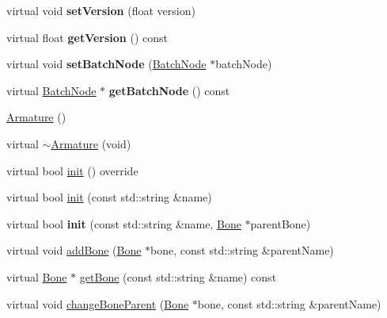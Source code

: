\begin{DoxyCompactItemize}
\item 
\mbox{\label{classcocostudio_1_1Armature_aa7a51245d492cd407f53d6118b4db04f}} 
virtual void {\bfseries set\+Version} (float version)
\item 
\mbox{\label{classcocostudio_1_1Armature_ab58b26fd8e6defdaf6027297337bb5b6}} 
virtual float {\bfseries get\+Version} () const
\item 
\mbox{\label{classcocostudio_1_1Armature_a955eae625c52b5c559f0265ef0ac8ae8}} 
virtual void {\bfseries set\+Batch\+Node} (\hyperlink{classcocostudio_1_1BatchNode}{Batch\+Node} $\ast$batch\+Node)
\item 
\mbox{\label{classcocostudio_1_1Armature_a91867c634809bb6c93bc29b406ac3927}} 
virtual \hyperlink{classcocostudio_1_1BatchNode}{Batch\+Node} $\ast$ {\bfseries get\+Batch\+Node} () const
\item 
\hyperlink{classcocostudio_1_1Armature_a718f247b339d19f4159b9abf847826aa}{Armature} ()
\item 
virtual \hyperlink{classcocostudio_1_1Armature_a7823517771d2cbb4847197d987e89d12}{$\sim$\+Armature} (void)
\item 
virtual bool \hyperlink{classcocostudio_1_1Armature_a0040255ac5cd22f79d0756ed6ecf2e98}{init} () override
\item 
virtual bool \hyperlink{classcocostudio_1_1Armature_a22bc686ea92c2dad9559d848fb3554f1}{init} (const std\+::string \&name)
\item 
\mbox{\label{classcocostudio_1_1Armature_ab87c0172fffa77e39fe06a85c7c76c9d}} 
virtual bool {\bfseries init} (const std\+::string \&name, \hyperlink{classcocostudio_1_1Bone}{Bone} $\ast$parent\+Bone)
\item 
virtual void \hyperlink{classcocostudio_1_1Armature_a59f16d46413e78cf4b8cdcf17daa0971}{add\+Bone} (\hyperlink{classcocostudio_1_1Bone}{Bone} $\ast$bone, const std\+::string \&parent\+Name)
\item 
virtual \hyperlink{classcocostudio_1_1Bone}{Bone} $\ast$ \hyperlink{classcocostudio_1_1Armature_a69ac2b237149578f3762f843b1656ef5}{get\+Bone} (const std\+::string \&name) const
\item 
virtual void \hyperlink{classcocostudio_1_1Armature_a5f1f9869b893c204e02a8c451f4a1067}{change\+Bone\+Parent} (\hyperlink{classcocostudio_1_1Bone}{Bone} $\ast$bone, const std\+::string \&parent\+Name)

\end{DoxyCompactItemize}
